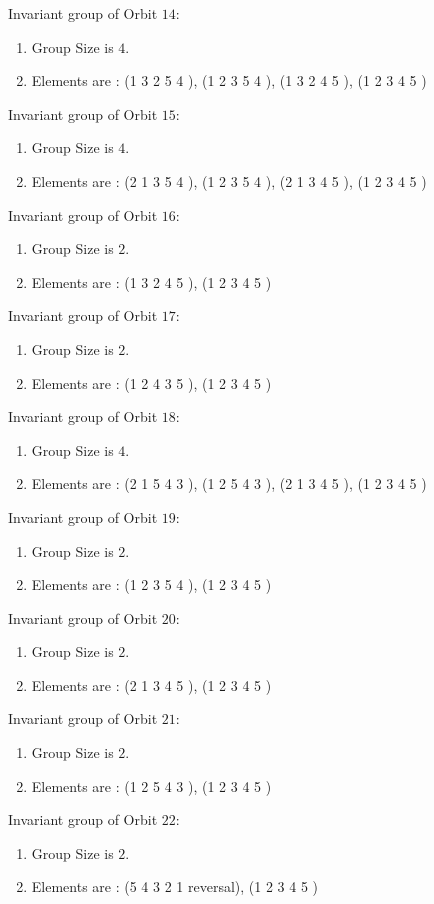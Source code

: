 \documentclass[12pt]{article}
\begin{document}
Invariant group of Orbit $14$:
\begin{enumerate}
\item Group Size is $4$.
\item Elements are : (1 3 2 5 4  ), (1 2 3 5 4  ), (1 3 2 4 5  ), (1 2 3 4 5  )
\end{enumerate}
Invariant group of Orbit $15$:
\begin{enumerate}
\item Group Size is $4$.
\item Elements are : (2 1 3 5 4  ), (1 2 3 5 4  ), (2 1 3 4 5  ), (1 2 3 4 5  )
\end{enumerate}
Invariant group of Orbit $16$:
\begin{enumerate}
\item Group Size is $2$.
\item Elements are : (1 3 2 4 5  ), (1 2 3 4 5  )
\end{enumerate}
Invariant group of Orbit $17$:
\begin{enumerate}
\item Group Size is $2$.
\item Elements are : (1 2 4 3 5  ), (1 2 3 4 5  )
\end{enumerate}
Invariant group of Orbit $18$:
\begin{enumerate}
\item Group Size is $4$.
\item Elements are : (2 1 5 4 3  ), (1 2 5 4 3  ), (2 1 3 4 5  ), (1 2 3 4 5  )
\end{enumerate}
Invariant group of Orbit $19$:
\begin{enumerate}
\item Group Size is $2$.
\item Elements are : (1 2 3 5 4  ), (1 2 3 4 5  )
\end{enumerate}
Invariant group of Orbit $20$:
\begin{enumerate}
\item Group Size is $2$.
\item Elements are : (2 1 3 4 5  ), (1 2 3 4 5  )
\end{enumerate}
Invariant group of Orbit $21$:
\begin{enumerate}
\item Group Size is $2$.
\item Elements are : (1 2 5 4 3  ), (1 2 3 4 5  )
\end{enumerate}
Invariant group of Orbit $22$:
\begin{enumerate}
\item Group Size is $2$.
\item Elements are : (5 4 3 2 1   reversal), (1 2 3 4 5  )
\end{enumerate}
\end{document}
